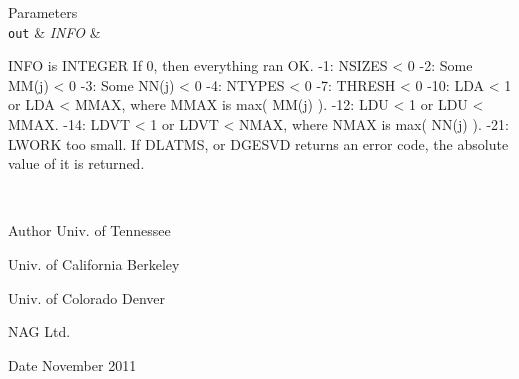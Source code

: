 \begin{DoxyParams}[1]{Parameters}
\\
\hline
\mbox{\tt out}  & {\em I\+N\+F\+O} & \begin{DoxyVerb}          INFO is INTEGER
          If 0, then everything ran OK.
           -1: NSIZES < 0
           -2: Some MM(j) < 0
           -3: Some NN(j) < 0
           -4: NTYPES < 0
           -7: THRESH < 0
          -10: LDA < 1 or LDA < MMAX, where MMAX is max( MM(j) ).
          -12: LDU < 1 or LDU < MMAX.
          -14: LDVT < 1 or LDVT < NMAX, where NMAX is max( NN(j) ).
          -21: LWORK too small.
          If  DLATMS, or DGESVD returns an error code, the
              absolute value of it is returned.\end{DoxyVerb}
 \\
\hline
\end{DoxyParams}
\begin{DoxyAuthor}{Author}
Univ. of Tennessee 

Univ. of California Berkeley 

Univ. of Colorado Denver 

N\+A\+G Ltd. 
\end{DoxyAuthor}
\begin{DoxyDate}{Date}
November 2011 
\end{DoxyDate}
\hypertarget{group__double__eig_ga8ffc2a465b9b10ab80fc13e6197d0dc3}{}
